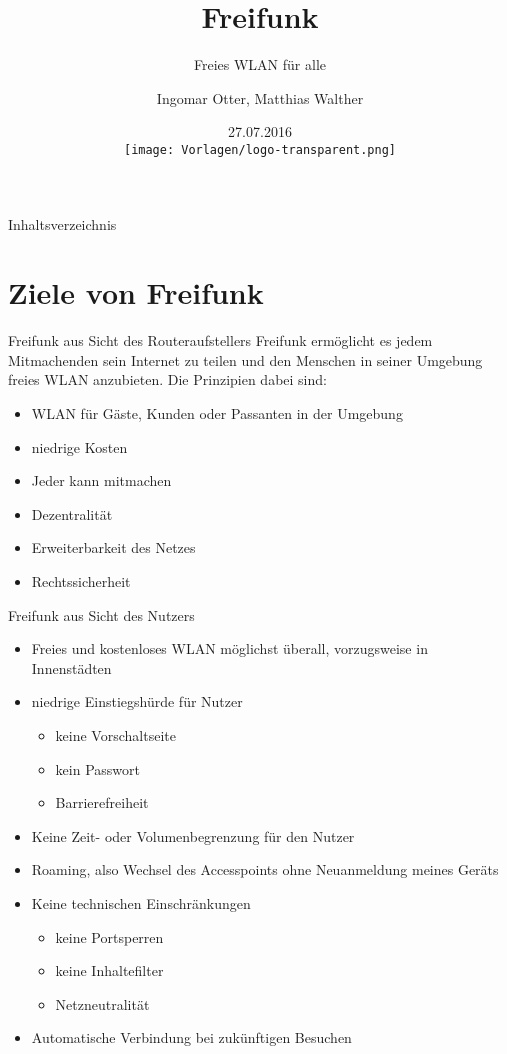 \documentclass{beamer}
\begin{document}
\title{Freifunk}
\subtitle{Freies WLAN für alle}
\author[I. Otter, M. Walther]{Ingomar Otter, Matthias Walther}
\date{27.07.2016\\\vspace{0.3cm} \texttt{[image: Vorlagen/logo-transparent.png]}}

\begin{frame}
\titlepage	
\end{frame}
\begin{frame}{Inhaltsverzeichnis}
	\tableofcontents
\end{frame}
\section{Ziele von Freifunk}
\begin{frame}{Freifunk aus Sicht des Routeraufstellers}
	Freifunk ermöglicht es jedem Mitmachenden sein Internet zu teilen und den Menschen in seiner Umgebung freies WLAN anzubieten. Die Prinzipien dabei sind:
	\begin{itemize}
		\item WLAN für Gäste, Kunden oder Passanten in der Umgebung
		\item niedrige Kosten
		\item Jeder kann mitmachen
		\item Dezentralität
		\item Erweiterbarkeit des Netzes
		\item Rechtssicherheit
	\end{itemize}
\end{frame}
\begin{frame}{Freifunk aus Sicht des Nutzers}
	\begin{itemize}
		\item Freies und kostenloses WLAN möglichst überall, vorzugsweise in Innenstädten
		\item niedrige Einstiegshürde für Nutzer
			\begin{itemize}
				\item keine Vorschaltseite
				\item kein Passwort
				\item Barrierefreiheit
			\end{itemize}
		\item Keine Zeit- oder Volumenbegrenzung für den Nutzer
		\item Roaming, also Wechsel des Accesspoints ohne Neuanmeldung meines Geräts
		\item Keine technischen Einschränkungen
			\begin{itemize}
				\item keine Portsperren
				\item keine Inhaltefilter
				\item Netzneutralität
			\end{itemize}
		\item Automatische Verbindung bei zukünftigen Besuchen
	\end{itemize}
\end{frame}
\end{document}
